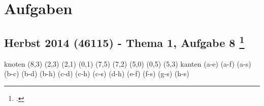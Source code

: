 \documentclass{lehramt-informatik}
\begin{document}


\chapter{Aufgaben}

\section{Herbst 2014 (46115) - Thema 1, Aufgabe 8
\footcite[Seite 2, Aufgabe 3: Tiefensuche, Breitensuche]{aud:ab:6}}

\graph knoten {
  (8,3)
  (2,3)
  (2,1)
  (0,1)
  (7,5)
  (7,2)
  (5,0)
  (0,5)
  (5,3)
} kanten {
  \kanteO(a-e)
  \kanteO(a-f)
  \kanteO(a-s)
  \kanteO(b-c)
  \kanteO(b-d)
  \kanteO(b-h)
  \kanteO(c-d)
  \kanteO(c-h)
  \kanteO(c-s)
  \kanteO(d-h)
  \kanteO(e-f)
  \kanteO(f-s)
  \kanteO(g-s)
  \kanteO(h-s)
}
\end{document}

